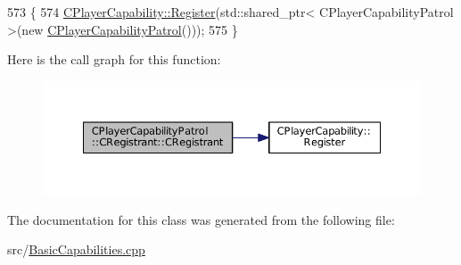 \begin{DoxyCode}
573                                                \{
574     \hyperlink{classCPlayerCapability_a7e298018dcde2684451add3cfff065f7}{CPlayerCapability::Register}(std::shared\_ptr< CPlayerCapabilityPatrol >(\textcolor{keyword}{new} 
      \hyperlink{classCPlayerCapabilityPatrol_a9c8653e6b0509a753d0b084f3988953b}{CPlayerCapabilityPatrol}()));   
575 \}
\end{DoxyCode}
Here is the call graph for this function\+:\nopagebreak
\begin{figure}[H]
\begin{center}
\leavevmode
\includegraphics[width=350pt]{classCPlayerCapabilityPatrol_1_1CRegistrant_a30363f71e5aeed45f3953729b07829ac_cgraph}
\end{center}
\end{figure}


The documentation for this class was generated from the following file\+:\begin{DoxyCompactItemize}
\item 
src/\hyperlink{BasicCapabilities_8cpp}{Basic\+Capabilities.\+cpp}\end{DoxyCompactItemize}
